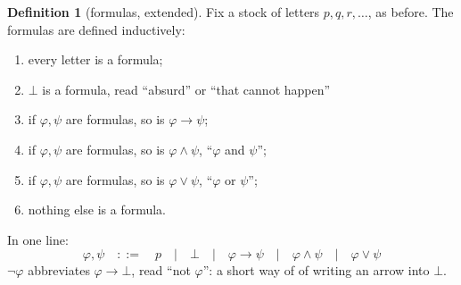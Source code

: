 \documentclass[a4paper, 11pt]{article}
\theoremstyle{definition}
\newtheorem{definition}{Definition}[section]
\begin{document}
\begin{definition}[formulas, extended]
    Fix a stock of letters $p, q, r, \dots$, as before. The formulas are defined inductively:
    \begin{enumerate}
        \item every letter is a formula;
        \item $\bot$ is a formula, read ``absurd'' or ``that cannot happen''
        \item if $\varphi, \psi$ are formulas, so is $\varphi \to \psi$;
        \item if $\varphi, \psi$ are formulas, so is $\varphi \land \psi$, ``$\varphi$ and $\psi$'';
        \item if $\varphi, \psi$ are formulas, so is $\varphi \lor \psi$, ``$\varphi$ or $\psi$'';
        \item nothing else is a formula.
    \end{enumerate}
    In one line: \[\varphi, \psi \quad ::= \quad p \quad |\quad \bot\quad  | \quad \varphi \to \psi \quad | \quad \varphi \land \psi \quad | \quad \varphi \lor \psi\]
    $\neg \varphi$ abbreviates $\varphi \to \bot$, read ``not $\varphi$'': a short way of of writing an arrow into $\bot$.
\end{definition}

\newpage
\end{document}
